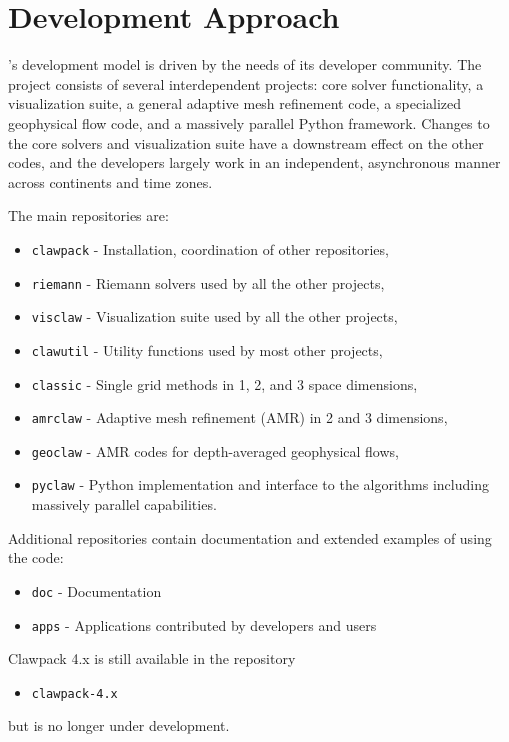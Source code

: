 %
%
%

\section{Development Approach}

\clawpack's development model is driven by the needs of its
developer community.  The \clawpack project consists of several
interdependent projects: core solver functionality, a
visualization suite, a general adaptive mesh refinement code, a
specialized geophysical flow code, and a massively parallel Python
framework.  Changes to the core solvers and visualization suite have a
downstream effect on the other codes, and the developers largely work
in an independent, asynchronous manner across continents and time
zones.

The main \clawpack repositories are:
\begin{itemize}
    \item \texttt{clawpack} - Installation, coordination of other repositories,
    \item \texttt{riemann} - Riemann solvers used by all the other projects,
    \item \texttt{visclaw} - Visualization suite used by all the other projects,
    \item \texttt{clawutil} - Utility functions used by most other projects,
    \item \texttt{classic} - Single grid methods in 1, 2, and 3 space
    dimensions,
    \item \texttt{amrclaw} - Adaptive mesh refinement (AMR) in 2 and 3 dimensions,
    \item \texttt{geoclaw} - AMR codes for depth-averaged geophysical flows,
    \item \texttt{pyclaw} - Python implementation and interface to the \clawpack algorithms including massively parallel capabilities.
\end{itemize}

Additional repositories contain documentation and extended examples of
using the code: 
\begin{itemize}
    \item \texttt{doc} - Documentation
    \item \texttt{apps} - Applications contributed by developers and users
\end{itemize}
Clawpack 4.x is still available in the repository
\begin{itemize}
    \item \texttt{clawpack-4.x}
\end{itemize}
but is no longer under development.

